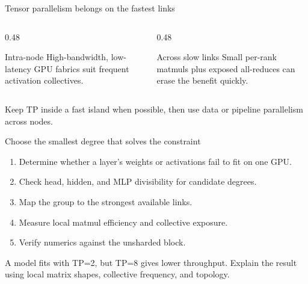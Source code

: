\documentclass[handout]{beamer}
\begin{document}
\begin{frame}{Tensor parallelism belongs on the fastest links}
  \begin{columns}[c]
    \begin{column}{0.48\linewidth}
      \begin{block}{Intra-node}
        High-bandwidth, low-latency GPU fabrics suit frequent activation collectives.
      \end{block}
    \end{column}
    \begin{column}{0.48\linewidth}
      \begin{alertblock}{Across slow links}
        Small per-rank matmuls plus exposed all-reduces can erase the benefit quickly.
      \end{alertblock}
    \end{column}
  \end{columns}
  \vfill
  Keep TP inside a fast island when possible, then use data or pipeline parallelism across nodes.
\end{frame}

\begin{frame}{Choose the smallest degree that solves the constraint}
  \begin{enumerate}
      \setlength{\itemsep}{7pt}
    \item Determine whether a layer's weights or activations fail to fit on one GPU.
    \item Check head, hidden, and MLP divisibility for candidate degrees.
    \item Map the group to the strongest available links.
    \item Measure local matmul efficiency and collective exposure.
    \item Verify numerics against the unsharded block.
  \end{enumerate}
\end{frame}

{A model fits with TP=2, but TP=8 gives lower throughput. Explain the result using local matrix shapes, collective frequency, and topology.}
\end{document}
